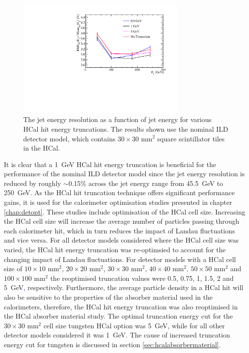 \begin{figure}[h!]
\includegraphics[width=0.75\textwidth]{EnergyEstimators/Plots/CellTruncation/JER_vs_JetEnergy_HCalCellTruncation.pdf}
\caption[The jet energy resolution as a function of jet energy for various HCal hit energy truncations.  The results shown use the nominal ILD detector model, which contains $30\times30 \text{ mm}^{2}$ square scintillator tiles in the HCal.]{The jet energy resolution as a function of jet energy for various HCal hit energy truncations.  The results shown use the nominal ILD detector model, which contains $30\times30 \text{ mm}^{2}$ square scintillator tiles in the HCal.}
\label{fig:jercelltrunc}
\end{figure}

It is clear that a 1~GeV HCal hit energy truncation is beneficial for the performance of the nominal ILD detector model since the jet energy resolution is reduced by roughly $\sim$0.15\% across the jet energy range from 45.5~GeV to 250~GeV.  As the HCal hit truncation technique offers significant performance gains, it is used for the calorimeter optimisation studies presented in chapter \ref{chap:detopt}.  These studies include optimisation of the HCal cell size.  Increasing the HCal cell size will increase the average number of particles passing through each calorimeter hit, which in turn reduces the impact of Landau fluctuations and vice versa.  For all detector models considered where the HCal cell size was varied, the HCal hit energy truncation was re-optimsied to account for the changing impact of Landau fluctuations.  For detector models with a HCal cell size of $10 \times 10\text{ mm}^{2}$, $20 \times 20\text{ mm}^{2}$, $30 \times 30\text{ mm}^{2}$, $40 \times 40\text{ mm}^{2}$, $50 \times 50\text{ mm}^{2}$ and $100 \times 100\text{ mm}^{2}$ the reoptimised truncation values were 0.5, 0.75, 1, 1.5, 2 and 5~GeV\textcolor{blue}{,} respectively.  Furthermore, the average particle density in a HCal hit will also be sensitive to the properties of the absorber material used in the calorimeters, therefore, the HCal hit energy truncation was also reoptimised in the HCal absorber material study.  The optimal truncation energy cut for the $30 \times 30\text{ mm}^{2}$ cell size tungsten HCal option was 5~GeV, while for all other detector models considered it was 1~GeV.  The cause of increased truncation energy cut for tungsten is discussed in section \ref{sec:hcalabsorbermaterial}.

